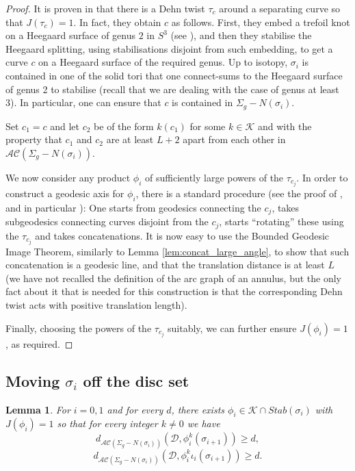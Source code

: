 \documentclass[11pt, oneside]{amsart}
\newtheorem{lemma}{Lemma}[section]
\theoremstyle{definition}
\theoremstyle{definition}
\newcommand{\calD} {\ensuremath {\mathcal{D}}}
\newcommand{\calE} {\ensuremath {\mathcal{E}}}
\begin{document}
 
 \begin{proof}
 It is proven in \cite[Lemma 5]{LubotzkyMaherWu} that there is a Dehn twist $\tau_{c}$ around a separating curve so that $J(\tau_c)=1$. In fact, they obtain $c$ as follows. First, they embed a trefoil knot on a Heegaard surface of genus $2$ in $S^3$ (see \cite[Figure 2]{LubotzkyMaherWu}), and then they stabilise the Heegaard splitting, using stabilisations disjoint from such embedding, to get a curve $c$ on a Heegaard surface of the required genus. Up to isotopy, $\sigma_i$ is contained in one of the solid tori that one connect-sums to the Heegaard surface of genus 2 to stabilise (recall that we are dealing with the case of genus at least 3). In particular, one can ensure that $c$ is contained in $\Sigma_g-N(\sigma_i)$.
 
 Set $c_1=c$ and let $c_2$ be of the form $k(c_1)$ for some $k\in\mathcal K$ and with the property that $c_1$ and $c_2$ are at least $L+2$ apart from each other in $\mathcal {AC}(\Sigma_g- N(\sigma_i))$.
  
  We now consider any product $\phi_i$ of sufficiently large powers of the $\tau_{c_j}$. In order to construct a geodesic axis for $\phi_i$, there is a standard procedure (see the proof of \cite[Proposition 3.3]{Mangahas}, and in particular \cite[Lemma 3.10]{Mangahas}): One starts from geodesics connecting the $c_j$, takes subgeodesics connecting curves disjoint from the $c_j$, starts ``rotating'' these using the $\tau_{c_j}$ and takes concatenations. It is now easy to use the Bounded Geodesic Image Theorem, similarly to Lemma \ref{lem:concat_large_angle}, to show that such concatenation is a geodesic line, and that the translation distance is at least $L$ (we have not recalled the definition of the arc graph of an annulus, but the only fact about it that is needed for this construction is that the corresponding Dehn twist acts with positive translation length).
  
  Finally, choosing the powers of the $\tau_{c_j}$ suitably, we can further ensure $J(\phi_i)=1$, as required.
 \end{proof}



\subsection{Moving $\sigma_i$ off the disc set}

\begin{lemma}\label{lem:rotate_off_disc_set}
 For $i=0,1$ and for every $d$, there exists $\phi_i\in \mathcal K\cap Stab(\sigma_i)$ with $J(\phi_i)=1$ so that for every integer $k\neq 0$ we have
 $$d_{\mathcal {AC}(\Sigma_g-N(\sigma_i))}(\calD,\phi^k_i(\sigma_{i+1}))\geq d,$$
 $$d_{\mathcal {AC}(\Sigma_g-N(\sigma_i))}(\calD,\phi^k_i\iota_i(\sigma_{i+1}))\geq d.$$
\end{lemma}
\end{document}
